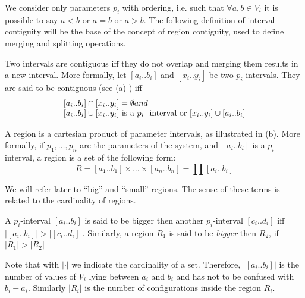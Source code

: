 We consider only parameters $p_{i}$ with ordering, i.e. such
that $\forall a,b\in V_{i}$ it is possible
to say $a<b$ or $a=b$ or $a>b$. 
The following definition of interval contiguity will be the base of the concept of region contiguity, used to define merging and splitting operations.
\begin{definition}
\label{pers02.def:Contiguous-intervals}
Two intervals are contiguous iff they do not overlap and merging them results in a new interval. More formally, let $\left[a_{i}..b_{i}\right]$ and $\left[x_{i}..y_{i}\right]$
be two $p_{i}$-intervals. They are said to be contiguous (see (a) ) iff
\begin{align}\begin{array}{l}
	\left[a_{i}..b_{i}\right]\cap\left[x_{i}..y_{i}\right]=\emptyset \mbox{      and} \\
	\left[a_{i}..b_{i}\right]\cup\left[x_{i}..y_{i}\right]$ is a $p_{i}$-
interval or $\left[x_{i}..y_{i}\right]\cup\left[a_{i}..b_{i}\right]
\end{array}\end{align}
\end{definition}

\begin{definition}[Region] 
A region is a cartesian product of parameter intervals, as illustrated in  (b). More formally, if $p_1,\dots,p_n$ are the parameters of the system, and $\left[ a_{i}..b_{i} \right]$ is a $p_i$-interval, a region is a set of the following form:
\[
R=\left[a_{1}..b_{1}\right]\times\dots\times\left[a_{n}..b_{n}\right]=\prod\left[a_{i}..b_{i}\right]
\]
\end{definition}

We will refer later to ``big'' and ``small'' regions. The sense
of these terms is related to the cardinality of regions.
\begin{definition}
A $p_{i}$-interval $\left[a_{i}..b_{i}\right]$
is said to be bigger then another $p_{i}$-interval $\left[c_{i}..d_{i}\right]$
iff 
$\left|\left[a_{i}..b_{i}\right]\right|>\left|\left[c_{i}..d_{i}\right]\right|$.
Similarly, a region $R_{1}$ is said to be \emph{bigger }then $R_{2}$, if
$\left|R_{1}\right|>\left|R_{2}\right|$
\end{definition}
Note that with $|\cdot|$ we indicate the cardinality of a set. Therefore, $\left|\left[a_{i}..b_{i}\right]\right|$ is the number of values of $V_i$ lying between $a_{i}$ and $b_{i}$ and has not to be confused with $b_i - a_i$.
Similarly $\left|R_{i}\right|$ is the number of configurations inside the region $R_i$.

